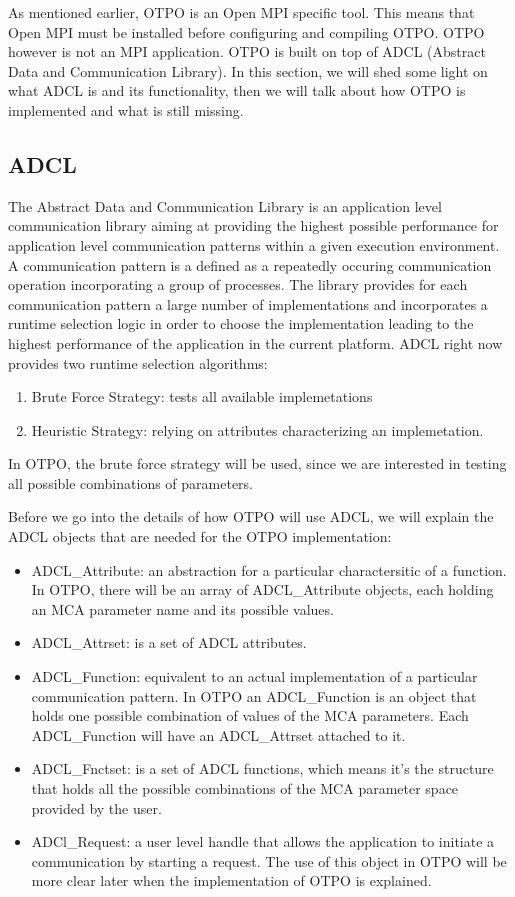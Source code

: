 As mentioned earlier, OTPO is an Open MPI specific tool. This means that Open
MPI must be installed before configuring and compiling OTPO. OTPO however is
not an MPI application. OTPO is built on top of ADCL \cite{ADCL} (Abstract
Data and Communication Library). In this section, we will shed some light on
what ADCL is and its functionality, then we will talk about how OTPO is
implemented and what is still missing.

\subsection{ADCL}
The Abstract Data and Communication Library is an application level
communication library aiming at providing the highest possible performance for
application level communication patterns within a given execution
environment. A communication pattern is a defined as a repeatedly occuring
communication operation incorporating a group of processes. The library
provides for each communication pattern a large number of implementations and
incorporates a runtime selection logic in order to choose the implementation
leading to the highest performance of the application in the current
platform. ADCL right now provides two runtime selection algorithms:
\begin{enumerate}
\item Brute Force Strategy: tests all available implemetations
\item Heuristic Strategy: relying on attributes characterizing an
  implemetation.
\end{enumerate}
In OTPO, the brute force strategy will be used, since we are interested in
testing all possible combinations of parameters.

Before we go into the details of how OTPO will use ADCL, we will explain the
ADCL objects that are needed for the OTPO implementation:
\begin{itemize}
\item ADCL\_Attribute\cite{ADCL-spec}: an abstraction for a particular
  charactersitic of a function. In OTPO, there will be an array of
  ADCL\_Attribute objects, each holding an MCA parameter name and its possible
  values.
\item ADCL\_Attrset\cite{ADCL-spec}: is a set of ADCL attributes.
\item ADCL\_Function\cite{ADCL-spec}: equivalent to an actual implementation
  of a particular communication pattern. In OTPO an ADCL\_Function is an
  object that holds one possible combination of values of the MCA
  parameters. Each ADCL\_Function will have an ADCL\_Attrset attached to it.
\item ADCL\_Fnctset\cite{ADCL-spec}: is a set of ADCL functions, which means
  it's the structure that holds all the possible combinations of the MCA
  parameter space provided by the user.
\item ADCl\_Request\cite{ADCL-spec}: a user level handle that allows the
  application to initiate a communication by starting a request. The use of
  this object in OTPO will be more clear later when the implementation of OTPO
  is explained.
\end{itemize}

